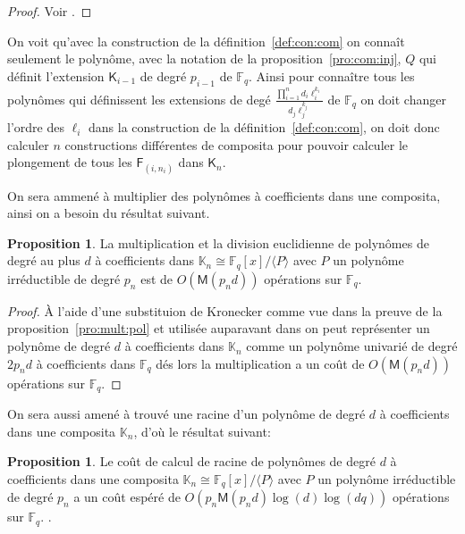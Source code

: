 \documentclass[10pt,a4paper]{book}
\theoremstyle{plain}
\theoremstyle{definition}
\theoremstyle{definition}
\theoremstyle{definition}
\newtheorem{prop}[thm]{Proposition}
\theoremstyle{definition}
\theoremstyle{remark}
\theoremstyle{remark}
\theoremstyle{definition}
\begin{document}
 \begin{proof}
 Voir \cite{DeFeoDoliskaniSchost14}.
\end{proof}  

On voit qu'avec la construction de la définition~\ref{def:con:com} on connaît 
seulement le polynôme, avec la notation de la proposition~\ref{pro:com:inj}, $Q$
qui définit l'extension $\mathsf{K}_{i-1}$ de degré $p_{i-1}$ de 
$\mathbb{F}_q$. Ainsi pour connaître tous les polynômes qui définissent les 
extensions de degé $\frac{\prod_{i=1}^{n}d_i\ell_i^{k_i}}{d_j \ell_j^{k_j}}$ de
$\mathbb{F}_q$ on doit changer l'ordre des $\ell_i$ dans la construction de la 
définition~\ref{def:con:com}, on doit donc calculer $n$ constructions 
différentes de composita pour pouvoir calculer le plongement de tous les 
$\mathsf{F}_{(i,n_i)}$ dans $\mathsf{K}_{n}$. 

 On sera ammené à multiplier des polynômes à coefficients dans une 
 composita, ainsi on a besoin du résultat suivant.

 \begin{prop}
 \label{pro:mul:com}
 La multiplication et la division euclidienne de polynômes de degré au plus $d$
 à coefficients dans $\mathbb{K}_{n} \cong \mathbb{F}_q[x]/ \langle P \rangle$
 avec $P$ un polynôme irréductible de degré $p_n$ est de $O(\mathsf{M}(p_nd))$ 
 opérations sur $\mathbb{F}_q$.
 \end{prop} 
 
 \begin{proof}
  \`A l'aide d'une substituion de Kronecker comme vue dans la preuve de la 
  proposition~\ref{pro:mult:pol} et utilisée auparavant dans 
 \cite[Lemma 2.2]{vzGShoup92} on peut représenter un polynôme de degré $d$ à 
 coefficients dans $\mathbb{K}_n$ comme un polynôme univarié de degré $2p_nd$ à 
 coefficients dans $\mathbb{F}_q$ dés lors la multiplication a un coût de 
 $O(\mathsf{M}(p_nd))$ opérations sur $\mathbb{F}_q$.
 \end{proof}
 
 On sera aussi amené à trouvé une racine d'un polynôme de degré $d$ à 
 coefficients dans une composita $\mathbb{K}_n$, d'où le résultat suivant:
 
\begin{prop}
 Le coût de calcul de racine de polynômes de degré $d$ à coefficients dans une 
 composita $\mathbb{K}_{n} \cong \mathbb{F}_q[x]/ \langle P \rangle$
 avec $P$ un polynôme irréductible de degré $p_n$ a un coût espéré de 
 $O(p_n \mathsf{M}(p_nd)\log(d)\log(dq))$ opérations sur $\mathbb{F}_q$. .
\end{prop}
 
\end{document}
